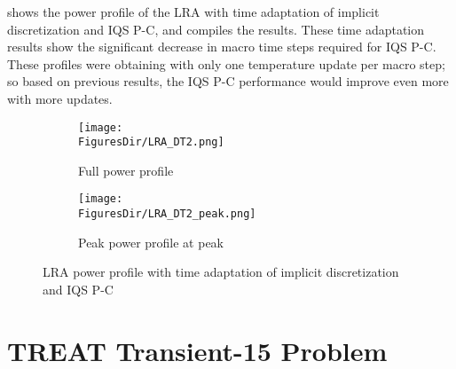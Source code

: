  shows the power profile of the LRA with time adaptation of implicit discretization and IQS P-C, and  compiles the results. These time adaptation results show the significant decrease in macro time steps required for IQS P-C. These profiles were obtaining with only one temperature update per macro step; so based on previous results, the IQS P-C performance would improve even more with more updates.

\begin{figure}[!htbp]
\centering
\begin{subfigure}[!htbp]{0.49\textwidth}
\texttt{[image: \\FiguresDir/LRA\_DT2.png]}
\caption{Full power profile}
\end{subfigure}
\begin{subfigure}[!htbp]{0.49\textwidth}
\texttt{[image: \\FiguresDir/LRA\_DT2\_peak.png]}
\caption{Peak power profile at peak}
\end{subfigure}
\caption{LRA power profile with time adaptation of implicit discretization and IQS P-C}
\label{fig:lra_dt2}
\end{figure}

\begin{table}
\begin{center}
\end{center}
\caption{LRA step doubling adaptation results with implicit discretization and IQS P-C}
\label{tab:lra_dt2}
\end{table}


\section{TREAT Transient-15 Problem}

